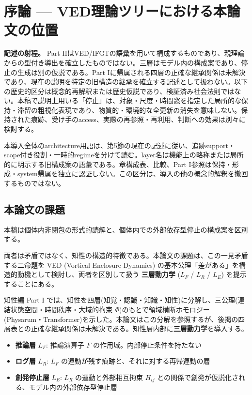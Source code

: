 \section{序論 — VED理論ツリーにおける本論文の位置}

\noindent\textbf{記述の射程。} Part IIはVED/IFGTの語彙を用いて構成するものであり、親理論からの型付き導出を確立したものではない。三層はモデル内の構成案であり、停止の生成は別の仮説である。Part Iに帰属される四層の正確な継承関係は未解決であり、現在の説明を特定の旧構造の継承を確立する記述として扱わない。以下の歴史的区分は概念的再解釈または歴史仮説であり、検証済み社会法則ではない。本稿で説明上用いる「停止」は、対象・尺度・時間窓を指定した局所的な保持・滞留の粗視化表現であり、物質的・環境的な全更新の消失を意味しない。保持された痕跡、受け手のaccess、実際の再参照・再利用、判断への効果は別々に検討する。

本導入全体のarchitecture用語は、第5節の現在の記述に従い、追跡support・scope付き役割・一時的regimeを分けて読む。layer名は機能上の略称または局所的に明示する旧構成案の語彙である。章構成表、比較、Part I参照は保持・形成・system帰属を独立に認証しない。この区分は、導入の他の概念的解釈を撤回するものではない。



\subsection{本論文の課題}


本稿は個体内非閉包の形式的読解と、個体内での外部依存型停止の構成案を区別する。

両者は矛盾ではなく、知性の構造的特徴である。本論文の課題は、この一見矛盾する二命題を VED (Vortical Enclosure Dynamics) の基本公理「差がある」を構造的動機として検討し、両者を区別して扱う \textbf{三層動力学} ($L_F$ / $L_R$ / $L_E$) を提示することにある。

知性編 Part I では、知性を四層(知覚・認識・知識・知性)に分解し、三公理(連結状態空間・時間秩序・大域的拘束 $\Phi$)のもとで領域横断ホモロジー(Physarum・Transformer)を示した。本論文はこの分解を参照するが、後掲の四層表との正確な継承関係は未解決である。知性層内部に\textbf{三層動力学}を導入する。

\begin{itemize}
\item \textbf{推論層} $L_F$: 推論演算子 $F$ の作用域。内部停止条件を持たない
\item \textbf{ログ層} $L_R$: $L_F$ の運動が残す痕跡と、それに対する再帰運動の層
\item \textbf{創発停止層} $L_E$: $L_R$ の運動と外部相互拘束 $H_{ij}$ との関係で創発が仮説化される、モデル内の外部依存型停止層
\end{itemize}


